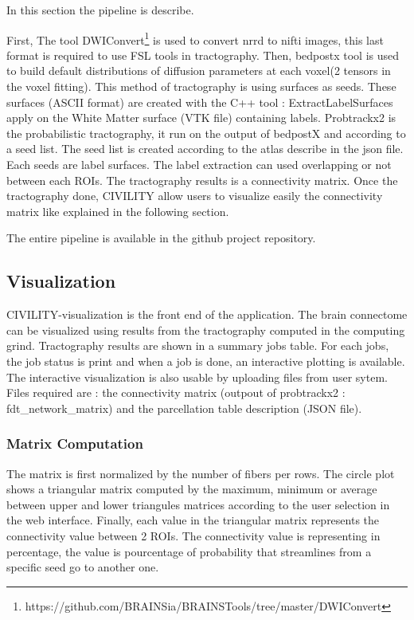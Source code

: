 \documentclass[]{spie}  %
\begin{document}
In this section the pipeline is describe. 

First, The tool DWIConvert\footnote{https://github.com/BRAINSia/BRAINSTools/tree/master/DWIConvert} is used to convert nrrd to nifti images, this last format is required to use FSL tools in tractography.
Then, bedpostx tool is used to build default distributions of diffusion parameters at each voxel(2 tensors in the voxel fitting).
This method of tractography is using surfaces as seeds. These surfaces  (ASCII format) are created with the C++ tool : ExtractLabelSurfaces apply on the White Matter surface (VTK file) containing labels.
Probtrackx2 is the probabilistic tractography, it run on the output of bedpostX and according to a seed list. The seed list is created according to the atlas describe in the json file. Each seeds are label surfaces.  The label extraction can used overlapping or not between each ROIs. The tractography results is a connectivity matrix.
Once the tractography done, CIVILITY allow users to visualize easily the connectivity matrix like explained in the following section. 

The entire pipeline is available in the github project repository.

\subsection{Visualization}

CIVILITY-visualization is the front end of the application. The brain connectome can be visualized using results from the tractography computed in the computing grind. 
Tractography results are shown in a summary jobs table. For each jobs, the job status is print and when a job is done, an interactive plotting is available. The interactive visualization is also usable by uploading files from user sytem. Files required are : the connectivity matrix (outpout of probtrackx2 : fdt\_network\_matrix) and the parcellation table description (JSON file).

\subsubsection{Matrix Computation}

The matrix is first normalized by the number of fibers per rows. The circle plot shows a triangular matrix computed by the maximum, minimum or average between upper and lower triangules matrices according to the user selection in the web interface. 
Finally, each value in the triangular matrix represents the connectivity value between 2 ROIs. The connectivity value is representing in percentage, the value is pourcentage of probability that streamlines from a specific seed go to another one.
\end{document}

